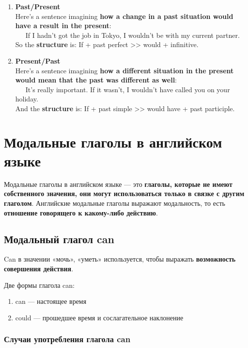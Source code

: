 \documentclass{article}
\begin{document}
\begin{enumerate}
	\item \textbf{Past/Present} \\
	Here's a sentence imagining \textbf{how a change in a past situation would have a result in the present}: \\
	\ \ \ If I hadn't got the job in Tokyo, I wouldn't be with my current partner. \\
	So the \textbf{structure} is: If + past perfect >> would + infinitive.
	\item \textbf{Present/Past} \\
	Here's a sentence imagining \textbf{how a different situation in the present would mean that the past was different as well}: \\
	\ \ \  It's really important. If it wasn't, I wouldn't have called you on your holiday. \\
	And the \textbf{structure} is: If + past simple >> would have + past participle.
\end{enumerate}

\section{Модальные глаголы в английском языке}

Модальные глаголы в английском языке — это \textbf{глаголы, которые не имеют собственного значения, они могут использоваться только в связке с другим глаголом}. Английские модальные глаголы выражают модальность, то есть \textbf{отношение говорящего к какому-либо действию}. 

\subsection{Модальный глагол \textbf{can}}

Can в значении «мочь», «уметь» используется, чтобы выражать \textbf{возможность совершения действия}.

Две формы глагола can:

\begin{enumerate}
	\item can — настоящее время 
	\item could — прошедшее время и сослагательное наклонение 
\end{enumerate}

\subsubsection{Случаи употребления глагола can}
\end{document}
